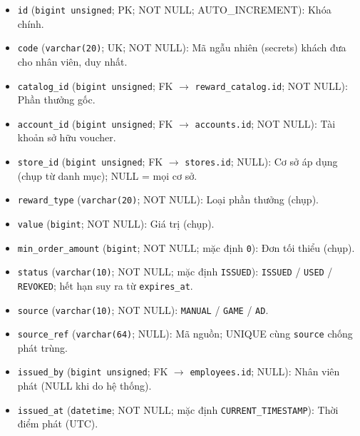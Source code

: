\begin{itemize}

\item \texttt{id} (\texttt{bigint unsigned}; PK; NOT NULL; AUTO_INCREMENT): Khóa chính.

\item \texttt{code} (\texttt{varchar(20)}; UK; NOT NULL): Mã ngẫu nhiên (secrets) khách đưa cho nhân viên, duy nhất.

\item \texttt{catalog\_id} (\texttt{bigint unsigned}; FK $\rightarrow$ \texttt{reward\_catalog.id}; NOT NULL): Phần thưởng gốc.

\item \texttt{account\_id} (\texttt{bigint unsigned}; FK $\rightarrow$ \texttt{accounts.id}; NOT NULL): Tài khoản sở hữu voucher.

\item \texttt{store\_id} (\texttt{bigint unsigned}; FK $\rightarrow$ \texttt{stores.id}; NULL): Cơ sở áp dụng (chụp từ danh mục); NULL = mọi cơ sở.

\item \texttt{reward\_type} (\texttt{varchar(20)}; NOT NULL): Loại phần thưởng (chụp).

\item \texttt{value} (\texttt{bigint}; NOT NULL): Giá trị (chụp).

\item \texttt{min\_order\_amount} (\texttt{bigint}; NOT NULL; mặc định \texttt{0}): Đơn tối thiểu (chụp).

\item \texttt{status} (\texttt{varchar(10)}; NOT NULL; mặc định \texttt{ISSUED}): \texttt{ISSUED} / \texttt{USED} / \texttt{REVOKED}; hết hạn suy ra từ \texttt{expires\_at}.

\item \texttt{source} (\texttt{varchar(10)}; NOT NULL): \texttt{MANUAL} / \texttt{GAME} / \texttt{AD}.

\item \texttt{source\_ref} (\texttt{varchar(64)}; NULL): Mã nguồn; UNIQUE cùng \texttt{source} chống phát trùng.

\item \texttt{issued\_by} (\texttt{bigint unsigned}; FK $\rightarrow$ \texttt{employees.id}; NULL): Nhân viên phát (NULL khi do hệ thống).

\item \texttt{issued\_at} (\texttt{datetime}; NOT NULL; mặc định \texttt{CURRENT\_TIMESTAMP}): Thời điểm phát (UTC).


\end{itemize}
